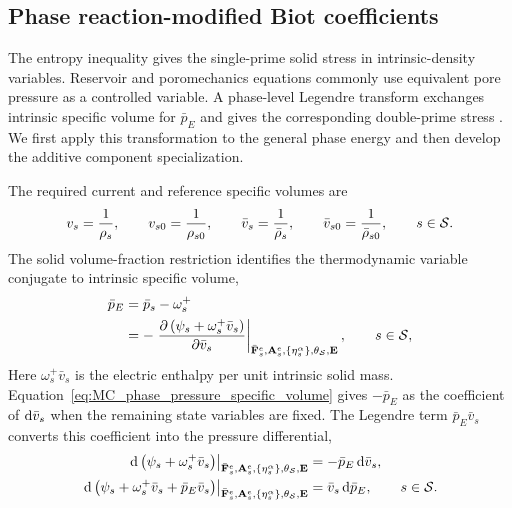 \subsection{Phase reaction-modified Biot coefficients}
\label{sec:MC_phase_biot_legendre_transform}

The entropy inequality gives the single-prime solid stress in intrinsic-density
variables.  Reservoir and poromechanics equations commonly use equivalent pore
pressure as a controlled variable.  A phase-level Legendre transform exchanges
intrinsic specific volume for \(\bar p_E\) and gives the corresponding
double-prime stress \cite{callen1985thermodynamics}.  We first apply this
transformation to the general phase energy and then develop the additive
component specialization.

The required current and reference specific volumes are
%
\begin{equation}
	v_s=\frac{1}{\rho_s},
	\qquad
	v_{s0}=\frac{1}{\rho_{s0}},
	\qquad
	\bar v_s=\frac{1}{\bar\rho_s},
	\qquad
	\bar v_{s0}=\frac{1}{\bar\rho_{s0}},
	\qquad
	s\in\mathcal{S} .
	\label{eq:MC_phase_specific_volumes}
\end{equation}
%
The solid volume-fraction restriction identifies the thermodynamic variable
conjugate to intrinsic specific volume,
%
\begin{align}
	\bar p_E
	 & =
	\bar p_s-\omega_s^+
	\notag \\
	 & =
	-
	\left.
	\frac{\partial 
		\left(
		\psi_s+\omega_s^+\bar v_s
		\right)
	}{\partial \bar v_s}
	\right\vert_{
		\bar{\mathbf{F}}_s^e,\mathbf{A}_s^e,
		\{\eta_s^\alpha\},\theta_{\mathcal{S}},\mathbf{E}
	},
	\qquad
	s\in\mathcal{S} ,
	\label{eq:MC_phase_pressure_specific_volume}
\end{align}
%
Here \(\omega_s^+\bar v_s\) is the electric enthalpy per unit intrinsic solid
mass.  Equation~\eqref{eq:MC_phase_pressure_specific_volume} gives
\(-\bar p_E\) as the coefficient of \({\rm d}\bar v_s\) when the remaining
state variables are fixed.  The Legendre term \(\bar p_E\bar v_s\) converts
this coefficient into the pressure differential,
%
\begin{align}
	\left.
	\mathrm d\left(
	\psi_s+\omega_s^+\bar v_s
	\right)
	\right\vert_{
		\bar{\mathbf{F}}_s^e,\mathbf{A}_s^e,
		\{\eta_s^\alpha\},\theta_{\mathcal{S}},\mathbf{E}
	}
	&=
	-\bar p_E\,{\rm d}\bar v_s,
	\notag \\
	\left.
	{\rm d}\left(
	\psi_s+\omega_s^+\bar v_s+\bar p_E\bar v_s
	\right)
	\right\vert_{
		\bar{\mathbf{F}}_s^e,\mathbf{A}_s^e,
		\{\eta_s^\alpha\},\theta_{\mathcal{S}},\mathbf{E}
	}
	&=
	\bar v_s\,{\rm d}\bar p_E,
	\qquad
	s\in\mathcal{S} .
	\label{eq:MC_phase_legendre_differential_cancellation}
\end{align}
